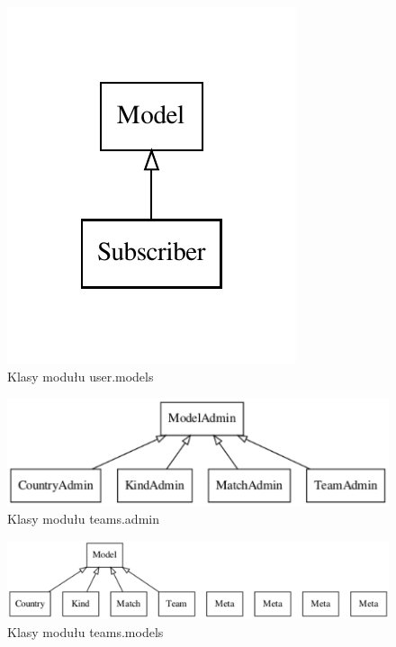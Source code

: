 \documentclass[11pt,a4paper]{article}
\begin{document}
    \begin{figure}[!h]
        \begin{center}
            \includegraphics{images/classes_users_models.pdf}
        \end{center}
        \caption{Klasy modułu user.models}
    \end{figure}

    \begin{figure}[!h]
        \begin{center}
            \includegraphics{images/classes_teams_admin.pdf}
        \end{center}
        \caption{Klasy modułu teams.admin}
    \end{figure}
    \begin{figure}[!h]
        \begin{center}
            \includegraphics[width=\textwidth]{images/classes_teams_models.pdf}
        \end{center}
        \caption{Klasy modułu teams.models}
    \end{figure}
\end{document}
